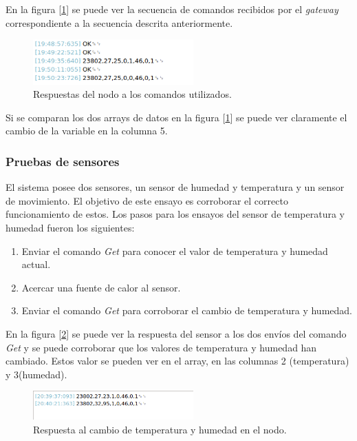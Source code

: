 En la figura [\ref{fig:aa1}] se puede ver la secuencia de comandos recibidos por el {\textit{gateway}} correspondiente a la secuencia descrita anteriormente.

\begin{figure}[h!]
	\centering
	\includegraphics[width=0.55\textwidth]{./Figures/aa1.png}
	\caption{Respuestas del nodo a los comandos utilizados.}
	\label{fig:aa1}
\end{figure}

Si se comparan los dos arrays de datos en la figura [\ref{fig:aa1}] se puede ver claramente el cambio de la variable en la columna 5.

\subsubsection{Pruebas de sensores}

El sistema posee dos sensores, un sensor de humedad y temperatura y un sensor de movimiento. El objetivo de este ensayo es corroborar el correcto funcionamiento de estos. Los pasos para los ensayos del sensor de temperatura y humedad fueron los siguientes:

\begin{enumerate}
\item Enviar el comando {\textit{Get}} para conocer el valor de temperatura y humedad actual.
\item Acercar una fuente de calor al sensor.
\item Enviar el comando {\textit{Get}} para corroborar el cambio de temperatura y humedad.
\end{enumerate}

En la figura [\ref{fig:sensores1}] se puede ver la respuesta del sensor a los dos envíos del comando {\textit{Get}} y se puede corroborar que los valores de temperatura y humedad han cambiado. Estos valor se pueden ver en el array, en las columnas 2 (temperatura) y 3(humedad).

\begin{figure}[h!]
	\centering
	\includegraphics[width=0.55\textwidth]{./Figures/sensores1.png}
	\caption{Respuesta al cambio de temperatura y humedad en el nodo.}
	\label{fig:sensores1}
\end{figure}

